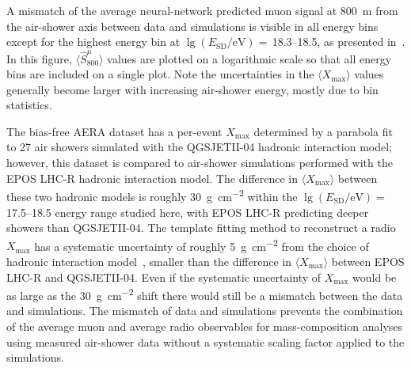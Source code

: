 


A mismatch of the average neural-network predicted muon signal at \qty{800}{\meter} from the air-shower axis between data and simulations is visible in all energy bins except for the highest energy bin at $\lg\left(E_{\text{SD}} / \text{eV}\right)=$\,\numrange{18.3}{18.5}, as presented in~.
In this figure, $\langle \hat{S}^{\mu}_{800}\rangle$ values are plotted on a logarithmic scale so that all energy bins are included on a single plot.
Note the uncertainties in the $\langle X_{\text{max}}\rangle$ values generally become larger with increasing air-shower energy, mostly due to bin statistics.

The bias-free AERA dataset has a per-event $X_{\text{max}}$ determined by a parabola fit to 27 air showers simulated with the QGSJETII-04 hadronic interaction model; however, this dataset is compared to air-shower simulations performed with the EPOS LHC-R hadronic interaction model.
The difference in $\langle X_{\text{max}}\rangle$ between these two hadronic models is roughly \qty{30}{\gram\per\centi\meter\squared} within the $\lg\left(E_{\text{SD}} / \text{eV}\right)=$\,\numrange{17.5}{18.5} energy range studied here, with EPOS LHC-R predicting deeper showers than QGSJETII-04.
The template fitting method to reconstruct a radio $X_{\text{max}}$ has a systematic uncertainty of roughly \qty{5}{\gram\per\centi\meter\squared} from the choice of hadronic interaction model~\cite{lofar_prd2014_xmax,auger_prd2024_aeraxmax,auger_prl2024_aeraxmax}, smaller than the difference in $\langle X_{\text{max}}\rangle$ between EPOS LHC-R and QGSJETII-04.
Even if the systematic uncertainty of $X_{\text{max}}$ would be as large as the \qty{30}{\gram\per\centi\meter\squared} shift there would still be a mismatch between the data and simulations.
The mismatch of data and simulations prevents the combination of the average muon and average radio observables for mass-composition analyses using measured air-shower data without a systematic scaling factor applied to the simulations.



